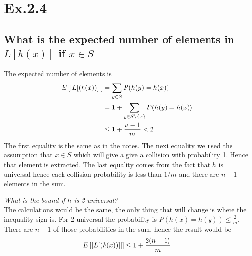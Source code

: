 \section*{Ex.2.4}
\subsection*{What is the expected number of elements in $L[h(x)]$ if $x \in S$}

The expected number of elements is
\begin{align*}
E\left[ \abs*{L[(h(x))]} \right] 
       &= \sum_{y\in S} P(h(y) = h(x)) \\
       &= 1 + \sum_{y\in S\backslash\{x\}} P(h(y) = h(x)) \\
       &\leq 1 + \frac{n-1}{m} < 2
\end{align*}
The first equality is the same as in the notes. The next equality we used the assumption that $x\in S$ which will give a give a collision with probability 1. Hence that element is extracted. The last equality comes from the fact that $h$ is universal hence each collision probability is less than $1/m$ and there are $n-1$ elements in the sum.

\emph{What is the bound if $h$ is 2 universal?}
\\
The calculations would be the same, the only thing that will change is where the inequality sign is. For 2 universal the probability is $P(h(x)=h(y))\leq \frac{2}{m}$. There are $n-1$ of those probabilities in the sum, hence the result would be
$$
E\left[ \abs*{L[(h(x))]} \right]  \leq 1 + \frac{2(n-1)}{m}
$$